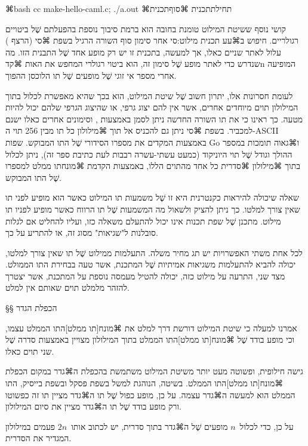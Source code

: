 ⌘bash
cc make-hello-caml.c; ./a.out
\END
⌘תחילת{תכנית}
\bashStdout
{}
⌘סוף{תכנית}

קושי נוסף ששיטת המילוט טומנת בחובה הוא ברמת סיבוך נוספת בהפעלתם שֶׁל ביטויים
רגולריים. חיפוש ב⌘עע תכנית מילוט:סי אחר סימון סוף השורה הרגיל בשפת ⌘סי (הרצף
{\let\ttfamily=\listingsfont\RL{\verb+\n+}}) עלול לאתר שניים כאלו, אך למעשה,
בתכנית זו יש רק מופע אחד שֶׁל התבנית הזו. מה שנדרש כדי לאתר מופע שֶׁל סימון זה,
הוא ביטוי רגולרי המחפש את האות ⌘קד{n} המופיעה אחרי מספר אי זוגי שֶׁל מופעים שֶׁל
תו הלוכסן ההפוך.

לעומת חסרונות אלו, יתרון חשוב שֶׁל שיטת המילוט, הוא בכך שהיא מאפשרת לכלול
בתוך המילולון תוים מיוחדים אחרים, אשר אין להם יצוג גרפי, או שהיצוג הגרפי
שלהם יכול להיות מטעה. כך ראינו כי את תו השורה החדשה ניתן לסמן באמצעות
{\let\ttfamily=\listingsfont\RL{\verb+\n+}},
וסימונים אחרים כאלו
ישנם למכביר. בשפת ⌘סי ניתן גם להכניס אל תוך ⌘מילולון כל תו מבין 256 תוי
ה-ASCII באמצעות  המקדים את מספרו הסידורי שֶׁל התו המבוקש. שפות
Go ו⌘גאוה תומכות במספר ההולך וגודל שֶׁל תוי היוניקוד (כמעט עשתי-עשרה רבבות לעת
כתיבת ספר זה), ניתן לכלול בתוך ⌘מילולון ⌘סדרית כל אחד מהתוים הללו, באמצעות
הקדמת ⌘מונח{תו ממלט} למספרו שֶׁל התו המבוקש.

שאלה שיכולה להיראות כקנטרנית היא זו שֶׁל משמעות תו המילוט כאשר הוא מופיע לפני תו
שאין צורך למלטו. כך ניתן להציק ולשאול מה המשמעות שֶׁל תו הרווח כאשר מופיע לפניו
תו מילוט. מתכנן שֶׁל שפת תכנות אינו יכול להתעלם משאלה כזו, ועליו להחליט אם לגלות
סובלנות ל"שגיאות" מסוג זה, או להתריע על כך.

לכל אחת משתי האפשרויות יש תג מחיר משלה. התעלמות ממילוט שֶׁל תו שאין צורך למלטו,
יכולה להביא להתעלמות משגיאות אמיתיות שֶׁל המתכנת, אשר טעה בבחירת התו הממולט. מצד
שני, התרעה על מילוט כזה, יכולה להטיל מעמסה נוספת על המתכנת, אשר יצטרך להזהר
מלמלט תוים שאותם אין למלט.

 
§§ הכפלת הגדר

אמרנו למעלה כי שיטת המילוט דורשת דרך למלט את ⌘מונח[תו ממלט]{התו הממלט} עצמו,
וכי מופע בודד שֶׁל ⌘מונח[תו ממלט]{התו הממלט} בתוך המילולון מצויין באמצעות סדרה
שֶׁל שני תוים כאלו.

גישה חילופית, ופשוטה מעט יותר משיטת המילוט משתמשת בהכפלת ה⌘גדר במקום הכפלת
⌘מונח[תו ממלט]{התו הממלט}. בשיטה, הנוהגת למשל בשפת פסקל ובשפת בייסיק,
התו הממלט הוא למעשה ה⌘גדר עצמה. על כן, מופע כפול שֶׁל תו ה⌘גדר מציין תו זה כפשוטו ורק מופע בודד שֶׁל תו ה⌘גדר מציין את
סיום המילולון.

על כן, כדי לכלול~\(n\) מופעים שֶׁל ה⌘גדר בתוך סדרית, יש לכתוב
אותו~\(2n\) פעמים במילולון המגדיר את הסדרית.


